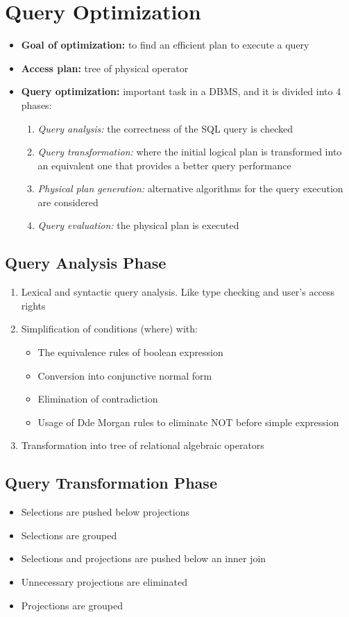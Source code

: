 \chapter{Query Optimization}
\begin{itemize}
    \item \textbf{Goal of optimization:} to find an efficient plan to execute a query
    \item \textbf{Access plan:} tree of physical operator
    \item \textbf{Query optimization:} important task in a DBMS, and it is divided into 4 phases:
    \begin{enumerate}
        \item \textit{Query analysis:} the correctness of the SQL query is checked
        \item \textit{Query transformation:} where the initial logical plan is transformed into an equivalent one that provides a better query performance
        \item \textit{Physical plan generation:} alternative algorithms for the query execution are considered
        \item \textit{Query evaluation:} the physical plan is executed
    \end{enumerate}
\end{itemize}

\section{Query Analysis Phase}
\begin{enumerate}
    \item Lexical and syntactic query analysis. Like type checking and user's access rights
    \item Simplification of conditions (where) with:
    \begin{itemize}
        \item The equivalence rules of boolean expression
        \item Conversion into conjunctive normal form
        \item Elimination of contradiction
        \item Usage of Dde Morgan rules to eliminate NOT before simple expression
    \end{itemize}
    \item Transformation into tree of relational algebraic operators
\end{enumerate}

\section{Query Transformation Phase}
\begin{itemize}
    \item Selections are pushed below projections
    \item Selections are grouped
    \item Selections and projections are pushed below an inner join
    \item Unnecessary projections are eliminated
    \item Projections are grouped
\end{itemize}

